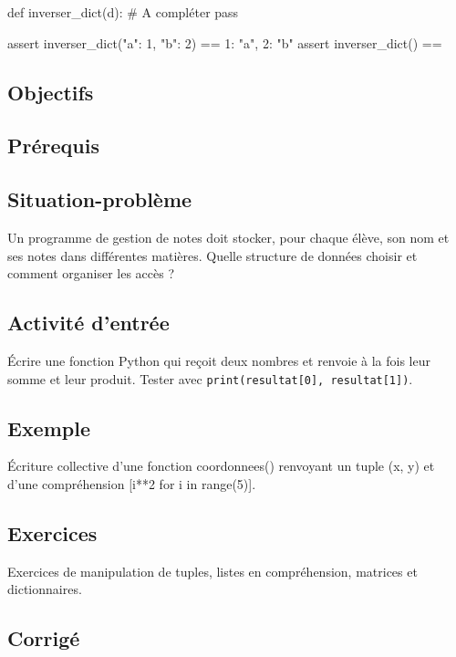 \begin{python}
def inverser_dict(d):
    # A compléter
    pass

assert inverser_dict({"a": 1, "b": 2}) == {1: "a", 2: "b"}
assert inverser_dict({}) == {}
\end{python}

\subsection{Objectifs}

\subsection{Prérequis}

\subsection{Situation-problème}

Un programme de gestion de notes doit stocker, pour chaque élève, son
nom et ses notes dans différentes matières. Quelle structure de données
choisir et comment organiser les accès ?

\subsection{Activité d’entrée}

Écrire une fonction Python qui reçoit deux nombres et renvoie à la fois
leur somme et leur produit. Tester avec \lstinline|print(resultat[0], resultat[1])|.

\subsection{Exemple}

Écriture collective d'une fonction coordonnees() renvoyant un tuple (x,
y) et d'une compréhension {[}i**2 for i in range(5){]}.

\subsection{Exercices}

Exercices de manipulation de tuples, listes en compréhension, matrices
et dictionnaires.

\subsection{Corrigé}

